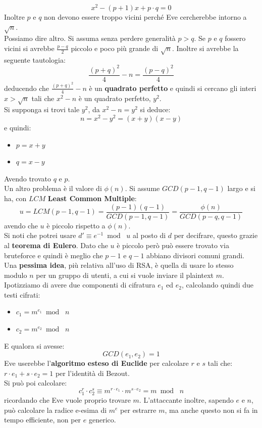 \documentclass[a4paper,12pt, oneside]{book}
\begin{document}
\[x^2-(p+1)x+p\cdot q=0\]
Inoltre $p$ e $q$ non devono essere troppo vicini perché Eve cercherebbe intorno
a $\sqrt{n}$.\\
Possiamo dire altro. Si assuma senza perdere generalità $p>q$. Se $p$ e $q$
fossero vicini si avrebbe $\frac{p-q}{2}$ piccolo e poco più grande di
$\sqrt{n}$. Inoltre si avrebbe la seguente tautologia:
\[\frac{(p+q)^2}{4}-n=\frac{(p-q)^2}{4}\]
deducendo che $\frac{(p+q)^2}{4}-n$ è un \textbf{quadrato perfetto} e quindi si
cercano gli interi $x> \sqrt{n}$ tali che $x^2-n$ è un quadrato perfetto,
$y^2$.\\
Si supponga si trovi tale $y^2$, da $x^2-n=y^2$ si deduce:
\[n=x^2-y^2=(x+y)(x-y)\]
e quindi:
\begin{itemize}
  \item $p=x+y$
  \item $q=x-y$
\end{itemize}
Avendo trovato $q$ e $p$.\\
Un altro problema è il valore di $\phi(n)$. 
Si assume $GCD(p-1,q-1)$ largo e si ha, con $LCM$ \textbf{Least Common
  Multiple}: 
\[u=LCM(p-1,q-1)=\frac{(p-1)(q-1)}{GCD(p-1,q-1)}=\frac{\phi(n)}{GCD(p-q,q-1)}\]
avendo che $u$ è piccolo rispetto a $\phi(n)$.\\
Si noti che potrei usare $d'\equiv e^{-1}\bmod \,\,u$ al posto di $d$ per
decifrare, questo grazie al \textbf{teorema di Eulero}. Dato che $u$ è piccolo
però può essere trovato via bruteforce e quindi è meglio che $p-1$ e $q-1$
abbiano divisori comuni grandi.\\
Una \textbf{pessima idea}, più relativa all'uso di RSA, è quella di usare lo
stesso modulo $n$ per un gruppo 
di utenti, a cui si vuole inviare il plaintext $m$. Ipotizziamo di avere due
componenti di cifratura $e_1$ ed $e_2$, calcolando quindi due testi cifrati:
\begin{itemize}
  \item $c_1=m^{e_1}\bmod \,\,n$
  \item $c_2=m^{e_2}\bmod \,\,n$
\end{itemize}
E qualora si avesse:
\[GCD(e_1,e_2)=1\]
Eve userebbe l'\textbf{algoritmo esteso di Euclide} per calcolare $r$ e $s$ tali
che:
$r\cdot e_1+s\cdot e_2=1$
per l'identità di Bezout.\\
Si può poi calcolare:
\[c_1^r\cdot c_2^s\equiv m^{r\cdot e_1}\cdot m^{s\cdot e_2}=m\bmod \,\,n\]
ricordando che Eve vuole proprio trovare $m$. L'attaccante inoltre, sapendo $e$
e $n$, può calcolare la radice e-esima di $m^e$ per estrarre $m$, ma anche
questo non si fa in tempo efficiente, non per $e$ generico.\\
\end{document}
